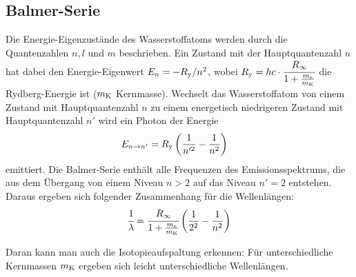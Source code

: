 \subsection{Balmer-Serie}
Die Energie-Eigenzustände des Wasserstoffatoms werden durch die Quantenzahlen $n,l$ und $m$ beschrieben. Ein Zustand mit der Hauptquantenzahl $n$ hat dabei den Energie-Eigenwert $E_n=-R_\mathrm{y}/n^2$, wobei $R_\mathrm{y} = hc\cdot \cfrac{R_\infty}{1+\frac{m_\mathrm{e}}{m_\mathrm{K}}}$ die Rydberg-Energie ist ($m_\mathrm{K}$ Kernmasse). Wechselt das Wasserstoffatom von einem Zustand mit Hauptquantenzahl $n$ zu einem energetisch niedrigeren Zustand mit Hauptquantenzahl $n'$ wird ein Photon der Energie 
\begin{align*}
  E_{n \rightarrow n'}&=R_\mathrm{y} \left( \frac{1}{n'^2} - \frac{1}{n^2}\right)
\end{align*}
emittiert. Die Balmer-Serie enthält alle Frequenzen des Emissionsspektrums, die aus dem Übergang von einem Niveau $n>2$ auf das Niveau $n'=2$ entstehen. Daraus ergeben sich folgender Zusammenhang für die Wellenlängen:
\begin{align}
  \cfrac{1}{\lambda} = \cfrac{R_\infty}{1+\frac{m_\mathrm{e}}{m_\mathrm{K}}} \left( \frac{1}{2^2} - \frac{1}{n^2}\right)
  \label{equ:rydberg}
\end{align}

Daran kann man auch die Isotopieaufspaltung erkennen: Für unterschiedliche Kernmassen $m_\mathrm{K}$ ergeben sich leicht unterschiedliche Wellenlängen. 

